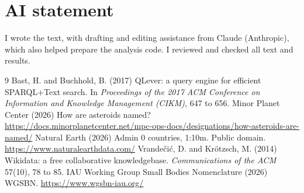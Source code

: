 \documentclass[11pt,a4paper]{article}
\begin{document}
\section*{AI statement}
I wrote the text, with drafting and editing assistance from Claude (Anthropic), which also helped prepare the analysis code. I reviewed and checked all text and results.

\begin{thebibliography}{9}
 Bast, H. and Buchhold, B. (2017) QLever: a query engine for efficient SPARQL+Text search. In \textit{Proceedings of the 2017 ACM Conference on Information and Knowledge Management (CIKM)}, 647 to 656.
 Minor Planet Center (2026) How are asteroids named? \url{https://docs.minorplanetcenter.net/mpc-ops-docs/designations/how-asteroids-are-named/}
 Natural Earth (2026) Admin 0 countries, 1:10m. Public domain. \url{https://www.naturalearthdata.com/}
 Vrande\v{c}i\'c, D. and Kr\"otzsch, M. (2014) Wikidata: a free collaborative knowledgebase. \textit{Communications of the ACM} 57(10), 78 to 85.
 IAU Working Group Small Bodies Nomenclature (2026) WGSBN. \url{https://www.wgsbn-iau.org/}
\end{thebibliography}
\end{document}
